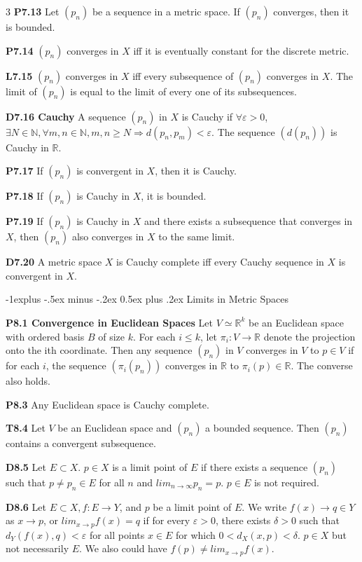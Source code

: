\documentclass[10pt, landscape]{article}
\makeatletter
\renewcommand{\section}{\@startsection{section}{1}{0mm}%
                                {-1ex plus -.5ex minus -.2ex}%
                                {0.5ex plus .2ex}%
                                {\normalfont\large\bfseries}}
\renewcommand{\section}{\@startsection{section}{2}{0mm}%
                                {-1explus -.5ex minus -.2ex}%
                                {0.5ex plus .2ex}%
                                {\normalfont\normalsize\bfseries}}
\makeatother
\begin{document}
\begin{multicols*}{3}
\textbf{P7.13} Let $(p_n)$ be a sequence in a metric space. If $(p_n)$ converges, then it is bounded.

\textbf{P7.14} $(p_n)$ converges in $X$ iff it is eventually constant for the discrete metric.

\textbf{L7.15} $(p_n)$ converges in $X$ iff every subsequence of $(p_n)$ converges in $X$. The limit of $(p_n)$ is equal to the limit of every one of its subsequences.

\textbf{D7.16 Cauchy} A sequence $(p_n)$ in $X$ is Cauchy if $\forall \varepsilon > 0$, $\exists N \in \mathbb{N}, \forall m, n \in \mathbb{N}, m, n \geq N \Rightarrow d(p_n, p_m) < \varepsilon$. The sequence $(d(p_n))$ is Cauchy in $\mathbb{R}$.

\textbf{P7.17} If $(p_n)$ is convergent in $X$, then it is Cauchy.

\textbf{P7.18} If $(p_n)$ is Cauchy in $X$, it is bounded.

\textbf{P7.19} If $(p_n)$ is Cauchy in $X$ and there exists a subsequence that converges in $X$, then $(p_n)$ also converges in $X$ to the same limit.

\textbf{D7.20} A metric space $X$ is Cauchy complete iff every Cauchy sequence in $X$ is convergent in $X$.

\section{Limits in Metric Spaces}

\textbf{P8.1 Convergence in Euclidean Spaces} Let $V \simeq \mathbb{R}^k$ be an Euclidean space with ordered basis $B$ of size $k$. For each $i \leq k$, let $\pi_i:V\rightarrow\mathbb{R}$ denote the projection onto the ith coordinate. Then any sequence $(p_n)$ in $V$ converges in $V$ to $p \in V$ if for each $i$, the sequence $(\pi_i(p_n))$ converges in $\mathbb{R}$ to $\pi_i(p) \in \mathbb{R}$. The converse also holds.

\textbf{P8.3} Any Euclidean space is Cauchy complete.

\textbf{T8.4} Let $V$ be an Euclidean space and $(p_n)$ a bounded sequence. Then $(p_n)$ contains a convergent subsequence.

\textbf{D8.5} Let $E\subset X$. $p \in X$ is a limit point of $E$ if there exists a sequence $(p_n)$ such that $p\neq p_n \in E$ for all $n$ and $lim_{n\rightarrow \infty}p_n=p$. $p\in E$ is not required.

\textbf{D8.6} Let $E \subset X, f:E\rightarrow Y$, and $p$ be a limit point of $E$. We write $f(x) \rightarrow q \in Y$ as $x \rightarrow p$, or $lim_{x \rightarrow p}f(x)=q$ if for every $\varepsilon > 0$, there exists $\delta > 0$ such that $d_Y(f(x), q) < \varepsilon$ for all points $x \in E$ for which $0 < d_X(x, p) < \delta$. $p \in X$ but not necessarily $E$. We also could have $f(p) \neq lim_{x\rightarrow p}f(x)$.


\end{multicols*}
\end{document}
